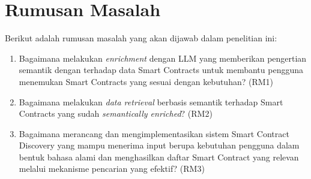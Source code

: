 \section{Rumusan Masalah}
\label{sec:rumusan-masalah}

Berikut adalah rumusan masalah yang akan dijawab dalam penelitian ini:
\begin{enumerate}

	\item Bagaimana melakukan \textit{enrichment} dengan LLM yang memberikan pengertian semantik dengan terhadap data Smart Contracts untuk membantu pengguna menemukan Smart Contracts yang sesuai dengan kebutuhan? (RM1)

	\item Bagaimana melakukan \textit{data retrieval} berbasis semantik terhadap Smart Contracts yang sudah \textit{semantically enriched}? (RM2)
	
	\item Bagaimana merancang dan mengimplementasikan sistem Smart Contract Discovery yang mampu menerima input berupa kebutuhan pengguna dalam bentuk bahasa alami dan menghasilkan daftar Smart Contract yang relevan melalui mekanisme pencarian yang efektif? (RM3)
\end{enumerate}



